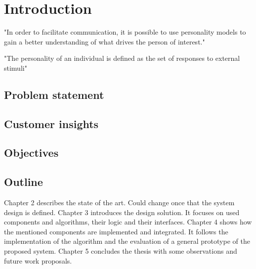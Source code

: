\chapter{Introduction}
"In order to facilitate communication, it is possible to use personality models to gain a better understanding of what drives the person of interest."

"The personality of an individual is defined as the set of responses to external stimuli"
\section{Problem statement}
\section{Customer insights}
\section{Objectives}
\section{Outline}
Chapter 2 describes the state of the art. Could change once that the system design is defined. Chapter 3 introduces the design solution. It focuses on used components and algorithms, their logic and their interfaces. Chapter 4 shows how the mentioned components are implemented and integrated. It follows the implementation of the algorithm and the evaluation of a general prototype of the proposed system. Chapter 5 concludes the thesis with some observations and future work proposals.